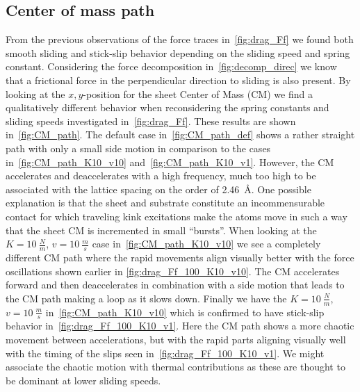 \subsection{Center of mass path}
From the previous observations of the force traces in~\cref{fig:drag_Ff} we found both smooth sliding and stick-slip behavior depending on the sliding speed and spring constant. Considering the force
decomposition in~\cref{fig:decomp_direc} we know that a frictional force in
the perpendicular direction to sliding is also present. By looking at the
$x,y$-position for the sheet Center of Mass (\acrshort{CM}) we find a qualitatively different behavior when reconsidering the spring constants and sliding speeds investigated in~\cref{fig:drag_Ff}. These results are shown in~\cref{fig:CM_path}. The default case in~\cref{fig:CM_path_def} shows a rather straight path with
only a small side motion in comparison to the cases in~\cref{fig:CM_path_K10_v10} and~\cref{fig:CM_path_K10_v1}. However, the \acrshort{CM} accelerates and deaccelerates with a high frequency, much too high
to be associated with the lattice spacing on the order of \SI{2.46}{Å}. One possible explanation is that the sheet and substrate
constitute an incommensurable contact for which traveling kink excitations make
the atoms move in such a way that the sheet \acrshort{CM} is incremented in small ``bursts''. When looking at the $K = \SI{10}{\frac{N}{m}}$, $v =
\SI{10}{\frac{m}{s}}$ case in~\cref{fig:CM_path_K10_v10} we see a completely
different \acrshort{CM} path where the rapid movements align visually better with
the force oscillations shown earlier in \cref{fig:drag_Ff_100_K10_v10}. The
\acrshort{CM} accelerates forward and then deaccelerates in combination with a
side motion that leads to the \acrshort{CM} path making a loop as it slows down.
Finally we have the $K = \SI{10}{\frac{N}{m}}$, $v = \SI{10}{\frac{m}{s}}$ in~\cref{fig:CM_path_K10_v10} which is confirmed to have stick-slip behavior in~\cref{fig:drag_Ff_100_K10_v1}. Here the \acrshort{CM} path shows a more chaotic
movement between accelerations, but with the rapid parts aligning visually well with the timing of the slips seen in~\cref{fig:drag_Ff_100_K10_v1}. We might associate the chaotic motion with thermal contributions as these are thought to be dominant at lower sliding speeds.  


